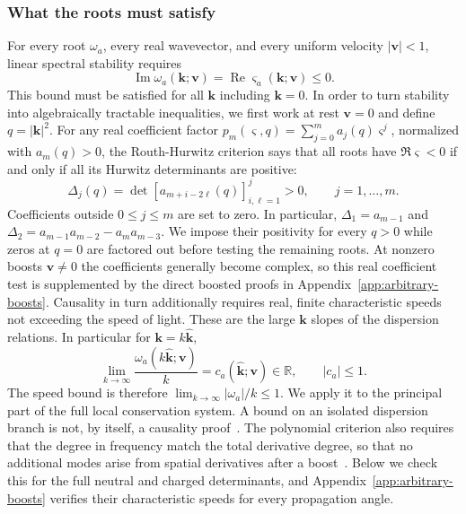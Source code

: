 \subsubsection{What the roots must satisfy}
For every root $\omega_a$, every real wavevector, and every
uniform velocity $|\mathbf v|<1$, linear spectral stability requires
\begin{equation}\label{eq:strategy-spectral-condition}
 \operatorname{Im}\omega_a(\mathbf k;\mathbf v)
 =\operatorname{Re}\varsigma_a(\mathbf k;\mathbf v)\leq0.
\end{equation}
This bound must be satisfied for all $\mathbf k$ including $\mathbf k=0$. In order to turn stability into algebraically tractable inequalities, we first work at rest $\mathbf v=0$ and 
define $q=|\mathbf k|^2$. For any real coefficient factor
$p_m(\varsigma,q)=\sum_{j=0}^{m}a_j(q)\varsigma^j$, normalized with $a_m(q)>0$,
the Routh-Hurwitz criterion says that all roots have $\Re \varsigma<0$ if and
only if all its Hurwitz determinants are positive:
\begin{equation}\label{eq:strategy-rh-definition}
 \Delta_j(q)=\det\!\left[a_{m+i-2\ell}(q)\right]_{i,\ell=1}^{j}>0,
 \qquad j=1,\ldots,m.
\end{equation}
Coefficients outside $0\leq j\leq m$ are set to zero. In particular,
$\Delta_1=a_{m-1}$ and
$\Delta_2=a_{m-1}a_{m-2}-a_ma_{m-3}$. We impose their positivity for every $q>0$ while
zeros at $q=0$ are factored out before testing the remaining roots. At nonzero boosts $\mathbf v\ne 0$ the coefficients generally
become complex, so this real coefficient test is supplemented by the direct boosted proofs in Appendix~\ref{app:arbitrary-boosts}. Causality  in turn additionally requires real,
finite characteristic speeds not exceeding the speed of light. These are the large $\mathbf k$ slopes of the dispersion relations. In particular for $\mathbf k=k\hat{\mathbf k}$,
\begin{equation}\label{eq:strategy-characteristic-condition}
 \lim_{k\to\infty}\frac{\omega_a(k\hat{\mathbf k};\mathbf v)}{k}
 =c_a(\hat{\mathbf k};\mathbf v)\in\mathbb R,
 \qquad |c_a|\leq1.
\end{equation}
The speed bound is therefore $\lim_{k\to\infty}|\omega_a|/k\leq1$.
We apply it to the principal part of the full local conservation system.
A bound on an isolated dispersion branch is not, by itself, a causality
proof~\cite{HoultKovtunDispersion,GavassinoDisconziNoronha}.
The polynomial criterion also requires that the degree in frequency
match the total derivative degree, so that no additional modes arise
from spatial derivatives after a boost~\cite{HoultKovtunDispersion}.
Below we check this for the full neutral and charged determinants,
and Appendix~\ref{app:arbitrary-boosts} verifies their characteristic
speeds for every propagation angle.



